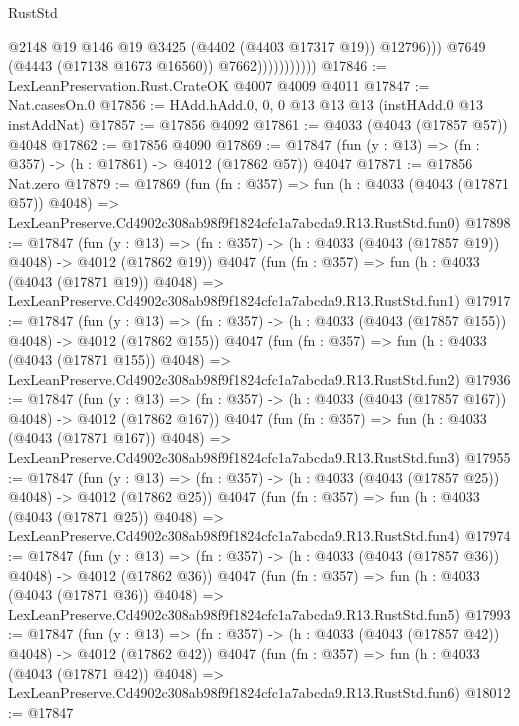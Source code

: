 \begin{lexlean}{RustStd}
\begin{coremodule}
                                @2148
                                @19
                                @146
                                @19
                                @3425
                                (@4402 (@4403 @17317 @19))
                                @12796)))
                          @7649
                          (@4443 (@17138 @1673 @16560))
                          @7662)))))))))))
@17846 := LexLeanPreservation.Rust.CrateOK @4007 @4009 @4011
@17847 := Nat.casesOn.{0}
@17856 := HAdd.hAdd.{0, 0, 0} @13 @13 @13 (instHAdd.{0} @13 instAddNat)
@17857 := @17856 @4092
@17861 := @4033 (@4043 (@17857 @57)) @4048
@17862 := @17856 @4090
@17869 := @17847 (fun (y : @13) => (fn : @357) -> (h : @17861) -> @4012 (@17862 @57)) @4047
@17871 := @17856 Nat.zero
@17879 := @17869
    (fun (fn : @357) =>
    fun (h : @4033 (@4043 (@17871 @57)) @4048) =>
    LexLeanPreserve.Cd4902c308ab98f9f1824cfc1a7abcda9.R13.RustStd.fun0)
@17898 := @17847
    (fun (y : @13) => (fn : @357) -> (h : @4033 (@4043 (@17857 @19)) @4048) -> @4012 (@17862 @19))
    @4047
    (fun (fn : @357) =>
    fun (h : @4033 (@4043 (@17871 @19)) @4048) =>
    LexLeanPreserve.Cd4902c308ab98f9f1824cfc1a7abcda9.R13.RustStd.fun1)
@17917 := @17847
    (fun (y : @13) => (fn : @357) -> (h : @4033 (@4043 (@17857 @155)) @4048) -> @4012 (@17862 @155))
    @4047
    (fun (fn : @357) =>
    fun (h : @4033 (@4043 (@17871 @155)) @4048) =>
    LexLeanPreserve.Cd4902c308ab98f9f1824cfc1a7abcda9.R13.RustStd.fun2)
@17936 := @17847
    (fun (y : @13) => (fn : @357) -> (h : @4033 (@4043 (@17857 @167)) @4048) -> @4012 (@17862 @167))
    @4047
    (fun (fn : @357) =>
    fun (h : @4033 (@4043 (@17871 @167)) @4048) =>
    LexLeanPreserve.Cd4902c308ab98f9f1824cfc1a7abcda9.R13.RustStd.fun3)
@17955 := @17847
    (fun (y : @13) => (fn : @357) -> (h : @4033 (@4043 (@17857 @25)) @4048) -> @4012 (@17862 @25))
    @4047
    (fun (fn : @357) =>
    fun (h : @4033 (@4043 (@17871 @25)) @4048) =>
    LexLeanPreserve.Cd4902c308ab98f9f1824cfc1a7abcda9.R13.RustStd.fun4)
@17974 := @17847
    (fun (y : @13) => (fn : @357) -> (h : @4033 (@4043 (@17857 @36)) @4048) -> @4012 (@17862 @36))
    @4047
    (fun (fn : @357) =>
    fun (h : @4033 (@4043 (@17871 @36)) @4048) =>
    LexLeanPreserve.Cd4902c308ab98f9f1824cfc1a7abcda9.R13.RustStd.fun5)
@17993 := @17847
    (fun (y : @13) => (fn : @357) -> (h : @4033 (@4043 (@17857 @42)) @4048) -> @4012 (@17862 @42))
    @4047
    (fun (fn : @357) =>
    fun (h : @4033 (@4043 (@17871 @42)) @4048) =>
    LexLeanPreserve.Cd4902c308ab98f9f1824cfc1a7abcda9.R13.RustStd.fun6)
@18012 := @17847

\end{coremodule}
\end{lexlean}
